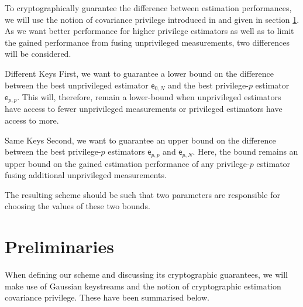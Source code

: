 \documentclass[conference]{IEEEtran}
\begin{document}
To cryptographically guarantee the difference between estimation performances, we will use the notion of covariance privilege introduced in \cite{risticCryptographicallyPrivilegedState2022} and given in section \ref{sec:prelim}. As we want better performance for higher privilege estimators as well as to limit the gained performance from fusing unprivileged measurements, two differences will be considered.
\begin{LaTeXdescription}
  \item[Different Keys] First, we want to guarantee a lower bound on the difference between the best unprivileged estimator $\mathsf{e}_{0,N}$ and the best privilege-$p$ estimator $\mathsf{e}_{p,p}$. This will, therefore, remain a lower-bound when unprivileged estimators have access to fewer unprivileged measurements or privileged estimators have access to more.
  \item[Same Keys] Second, we want to guarantee an upper bound on the difference between the best privilege-$p$ estimators $\mathsf{e}_{p,p}$ and $\mathsf{e}_{p,N}$. Here, the bound remains an upper bound on the gained estimation performance of any privilege-$p$ estimator fusing additional unprivileged measurements.
\end{LaTeXdescription}
The resulting scheme should be such that two parameters are responsible for choosing the values of these two bounds.

% 
%                                                                 
%                                                                 
%                                                                 
% 

\section{Preliminaries}\label{sec:prelim}
When defining our scheme and discussing its cryptographic guarantees, we will make use of Gaussian keystreams and the notion of cryptographic estimation covariance privilege. These have been summarised below.
\end{document}
